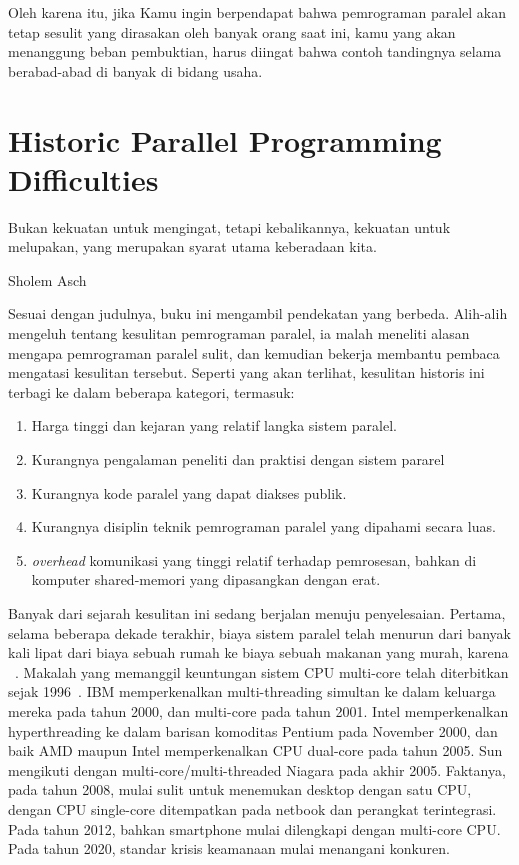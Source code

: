 Oleh karena itu, jika Kamu ingin berpendapat bahwa pemrograman paralel akan
tetap sesulit yang dirasakan oleh banyak orang saat ini, kamu yang akan
menanggung beban pembuktian, harus diingat bahwa contoh tandingnya selama
berabad-abad di banyak di bidang usaha.

\section{Historic Parallel Programming Difficulties}
\label{sec:intro:Historic Parallel Programming Difficulties}
%
\epigraph{Bukan kekuatan untuk mengingat, tetapi kebalikannya, kekuatan untuk
	  melupakan, yang merupakan syarat utama keberadaan kita.} {Sholem Asch}

Sesuai dengan judulnya, buku ini mengambil pendekatan yang berbeda. Alih-alih
mengeluh tentang kesulitan pemrograman paralel, ia malah meneliti alasan mengapa
pemrograman paralel sulit, dan kemudian bekerja membantu pembaca mengatasi
kesulitan tersebut. Seperti yang akan terlihat, kesulitan historis ini terbagi
ke dalam beberapa kategori, termasuk:

\begin{enumerate}
\item	Harga tinggi dan kejaran yang relatif langka sistem paralel.
\item 	Kurangnya pengalaman peneliti dan praktisi dengan sistem pararel
\item 	Kurangnya kode paralel yang dapat diakses publik.
\item 	Kurangnya disiplin teknik pemrograman paralel yang dipahami secara luas.
\item 	{\it overhead} komunikasi yang tinggi relatif terhadap pemrosesan,
	bahkan di komputer shared-memori yang dipasangkan dengan erat.
\end{enumerate}

Banyak dari sejarah kesulitan ini sedang berjalan menuju penyelesaian. Pertama,
selama beberapa dekade terakhir, biaya sistem paralel telah menurun dari banyak
kali lipat dari biaya sebuah rumah ke biaya sebuah makanan yang murah, karena
~\cite{GordonMoore1965MooresLaw}.
Makalah yang memanggil keuntungan sistem CPU multi-core telah diterbitkan sejak
1996~\cite{Olukotun96}. IBM memperkenalkan multi-threading simultan ke dalam
keluarga \Power{} mereka pada tahun 2000, dan multi-core pada tahun 2001. Intel
memperkenalkan hyperthreading ke dalam barisan komoditas Pentium pada November
2000, dan baik AMD maupun Intel memperkenalkan CPU dual-core pada tahun 2005.
Sun mengikuti dengan multi-core/multi-threaded Niagara pada akhir 2005.
Faktanya, pada tahun 2008, mulai sulit untuk menemukan desktop dengan satu CPU,
dengan CPU single-core ditempatkan pada netbook dan perangkat terintegrasi. Pada
tahun 2012, bahkan smartphone mulai dilengkapi dengan multi-core CPU. Pada tahun
2020, standar krisis keamanaan mulai menangani konkuren.

